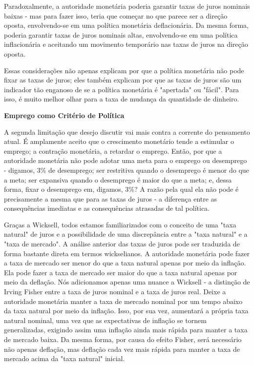 \documentclass[a4paper,12pt]{article}[abntex2]
\begin{document}
Paradoxalmente, a autoridade monetária poderia garantir taxas de juros nominais baixas - mas para fazer isso, teria que começar no que parece ser a direção oposta, envolvendo-se em uma política monetária deflacionária. Da mesma forma, poderia garantir taxas de juros nominais altas, envolvendo-se em uma política inflacionária e aceitando um movimento temporário nas taxas de juros na direção oposta.

Essas considerações não apenas explicam por que a política monetária não pode fixar as taxas de juros; eles também explicam por que as taxas de juros são um indicador tão enganoso de se a política monetária é "apertada" ou "fácil". Para isso, é muito melhor olhar para a taxa de mudança da quantidade de dinheiro.

\textbf{Emprego como Critério de Política}

A segunda limitação que desejo discutir vai mais contra a corrente do pensamento atual. É amplamente aceito que o crescimento monetário tende a estimular o emprego; a contração monetária, a retardar o emprego. Então, por que a autoridade monetária não pode adotar uma meta para o emprego ou desemprego - digamos, 3\% de desemprego; ser restritiva quando o desemprego é menor do que a meta; ser expansiva quando o desemprego é maior do que a meta; e, dessa forma, fixar o desemprego em, digamos, 3\%? A razão pela qual ela não pode é precisamente a mesma que para as taxas de juros - a diferença entre as consequências imediatas e as consequências atrasadas de tal política.

Graças a Wicksell, todos estamos familiarizados com o conceito de uma "taxa natural" de juros e a possibilidade de uma discrepância entre a "taxa natural" e a "taxa de mercado". A análise anterior das taxas de juros pode ser traduzida de forma bastante direta em termos wickselianos. A autoridade monetária pode fazer a taxa de mercado ser menor do que a taxa natural apenas por meio da inflação. Ela pode fazer a taxa de mercado ser maior do que a taxa natural apenas por meio da deflação. Nós adicionamos apenas uma nuance a Wicksell - a distinção de Irving Fisher entre a taxa de juros nominal e a taxa de juros real. Deixe a autoridade monetária manter a taxa de mercado nominal por um tempo abaixo da taxa natural por meio da inflação. Isso, por sua vez, aumentará a própria taxa natural nominal, uma vez que as expectativas de inflação se tornem generalizadas, exigindo assim uma inflação ainda mais rápida para manter a taxa de mercado baixa. Da mesma forma, por causa do efeito Fisher, será necessário não apenas deflação, mas deflação cada vez mais rápida para manter a taxa de mercado acima da "taxa natural" inicial.
\end{document}
